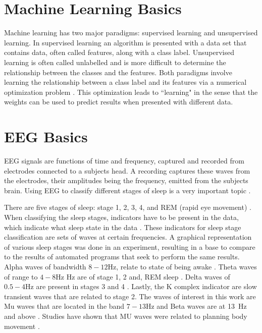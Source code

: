 \documentclass[conference,compsoc]{IEEEtran}
\begin{document}
\section{Machine Learning Basics}
Machine learning has two major paradigms: supervised learning and unsupervised learning.  In supervised learning an algorithm is presented with a data set that contains data, often called features, along with a class label.  Unsupervised learning is often called unlabelled and is more difficult to determine the relationship between the classes and the features.  Both paradigms involve learning the relationship between a class label and its features via a numerical optimization problem \cite{book}. 
This optimization leads to ``learning" in the sense that the weights can be used to predict results when presented with different data. %


\section{EEG Basics}
EEG signals are functions of time and frequency, captured and recorded from electrodes connected to a subjects head. A recording captures these waves from the electrodes, their amplitudes being the frequency, emitted from the subjects brain.  
Using EEG to classify different stages of sleep is a very important topic \cite{auto}.

There are five stages of sleep:  stage 1, 2, 3, 4, and REM (rapid eye movement) \cite{sleep}. When classifying the sleep stages, indicators 
have to be present in the data, which indicate what sleep state in the data \cite{auto}. These indicators for sleep stage classification are sets of waves at certain frequencies. A graphical representation of various sleep stages was done in an experiment, resulting in a base to compare to the results of automated programs that seek to perform the same results. Alpha waves of bandwidth $8-12\si{\hertz}$, relate to state of being awake \cite{auto}. Theta waves of range to $4-8\si{\hertz}$ Hz are of stage 1, 2 and, REM sleep \cite{auto}.  Delta waves of $0.5-4\si{\hertz}$ are present in stages 3 and 4 \cite{auto}. Lastly, the K complex indicator are slow transient waves that are related to stage 2.  The waves of interest in this work are Mu waves that are located in the band $7 - 13\si{\hertz}$ and Beta waves are at \SI{13}{\hertz} and above \cite{classsvm}. Studies have shown that MU waves were related to planning body movement \cite{classsvm}.
\end{document}
